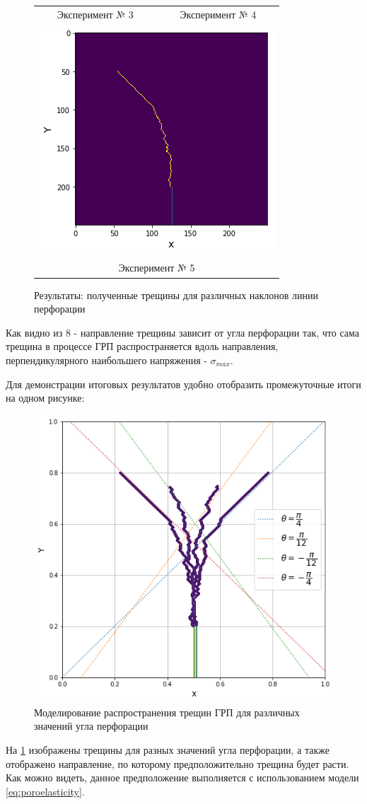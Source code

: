 \begin{figure}
\begin{tabular}{cc}
		Эксперимент № 3 & Эксперимент № 4 \\[6pt]
		\multicolumn{2}{c}{\includegraphics[width=0.45 \textwidth]{images/part2/crack_5.png} }\\
		\multicolumn{2}{c}{Эксперимент № 5}
	\end{tabular}
	\caption{Результаты: полученные трещины для различных наклонов линии перфорации}
\end{figure}

Как видно из 8 - направление трещины зависит от угла перфорации так, что сама трещина в процессе ГРП распространяется вдоль направления, перпендикулярного наибольшего напряжения - $\sigma_{max}$.

Для демонстрации итоговых результатов удобно отобразить промежуточные итоги на одном рисунке:
\begin{figure}
	\centering
	\includegraphics[width=0.65 \textwidth]{images/part2/cracks.png}
	\caption{Моделирование распространения трещин ГРП для различных значений угла перфорации}
	\label{fig:cracks}
\end{figure}



На \ref{fig:cracks} изображены трещины для разных значений угла перфорации, а также отображено направление, по которому предположительно трещина будет расти. Как можно видеть, данное предположение выполняется с использованием модели \eqref{eq:poroelasticity}.

